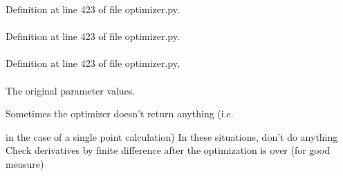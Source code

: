 \-Definition at line 423 of file optimizer.\-py.

\hypertarget{classforcebalance_1_1optimizer_1_1Optimizer_aa082af516e968d41a0e54e5f5901601f}{
\paragraph[{\-H}]{}}\label{classforcebalance_1_1optimizer_1_1Optimizer_aa082af516e968d41a0e54e5f5901601f}


\-Definition at line 423 of file optimizer.\-py.

\hypertarget{classforcebalance_1_1optimizer_1_1Optimizer_ae284871845ef6112dfd915bcb413ef8a}{
\paragraph[{\-Hess}]{}}\label{classforcebalance_1_1optimizer_1_1Optimizer_ae284871845ef6112dfd915bcb413ef8a}


\-Definition at line 423 of file optimizer.\-py.

\hypertarget{classforcebalance_1_1optimizer_1_1Optimizer_a2b9976e6502107bc6d11868e9b6ddf75}{
\paragraph[{mvals0}]{}}\label{classforcebalance_1_1optimizer_1_1Optimizer_a2b9976e6502107bc6d11868e9b6ddf75}


\-The original parameter values. 

\-Sometimes the optimizer doesn't return anything (i.\-e.

in the case of a single point calculation) \-In these situations, don't do anything \-Check derivatives by finite difference after the optimization is over (for good measure) 

